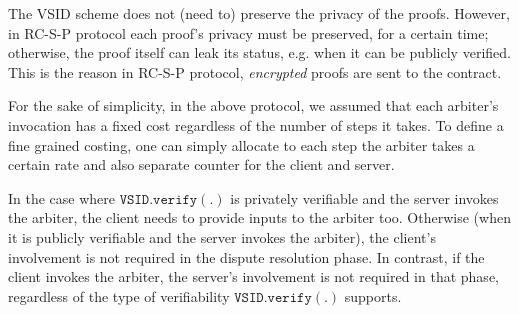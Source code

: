 \begin{remark} The VSID scheme  does not (need to) preserve the privacy of the proofs. However, in RC-S-P  protocol  each proof's privacy must be preserved, for a certain time; otherwise, the proof itself can leak its status, e.g. when it can be publicly verified. This is the reason in RC-S-P protocol,  \emph{encrypted} proofs are sent to the contract.   
\end{remark}


\begin{remark}
For the sake of simplicity, in the above protocol, we assumed that each arbiter's invocation has a fixed  cost regardless of the number of steps it takes. To define a fine grained costing, one can simply allocate to each step the arbiter takes a certain rate and also separate counter  for the client and server.  
\end{remark}

\begin{remark}
In the case where $\mathtt{VSID.verify}(.)$ is privately verifiable and    the server invokes the arbiter, the client needs to provide inputs to the arbiter too. Otherwise (when it is publicly verifiable and  the server invokes the arbiter), the client's involvement is not required in the dispute resolution phase.  In contrast, if the client invokes the arbiter, the server's involvement is not required in that phase, regardless of the type of verifiability $\mathtt{VSID.verify}(.)$ supports. 
\end{remark}




 
 
 
 



